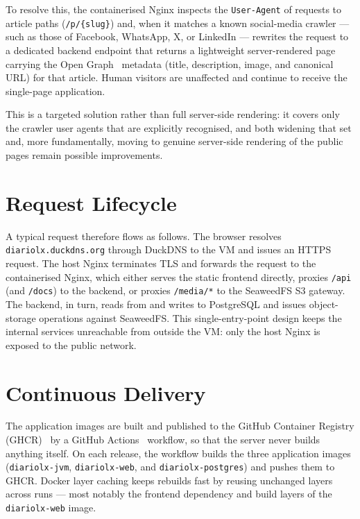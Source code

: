 To resolve this, the containerised Nginx inspects the \texttt{User-Agent} of requests to
article paths (\texttt{/p/\{slug\}}) and, when it matches a known social-media crawler ---
such as those of Facebook, WhatsApp, X, or LinkedIn --- rewrites the request to a dedicated
backend endpoint that returns a lightweight server-rendered page carrying the Open
Graph~\cite{ogp} metadata (title, description, image, and canonical URL) for that article.
Human visitors are unaffected and continue to receive the single-page application.

This is a targeted solution rather than full server-side rendering: it covers only the
crawler user agents that are explicitly recognised, and both widening that set and, more
fundamentally, moving to genuine server-side rendering of the public pages remain possible
improvements.

\section{Request Lifecycle} \label{sec:dep_lifecycle}

A typical request therefore flows as follows. The browser resolves
\texttt{diariolx.duckdns.org} through DuckDNS to the VM and issues an HTTPS request. The
host Nginx terminates TLS and forwards the request to the containerised Nginx, which
either serves the static frontend directly, proxies \texttt{/api} (and \texttt{/docs})
to the backend, or proxies \texttt{/media/*} to the SeaweedFS S3 gateway. The backend,
in turn, reads from and writes to PostgreSQL and issues object-storage operations
against SeaweedFS. This single-entry-point design keeps the internal services
unreachable from outside the VM: only the host Nginx is exposed to the public network.

\section{Continuous Delivery} \label{sec:dep_cd}

The application images are built and published to the GitHub Container Registry (GHCR)~\cite{ghcr}
by a GitHub Actions~\cite{github_actions} workflow, so that the server never builds anything itself. On each
release, the workflow builds the three application images (\texttt{diariolx-jvm},
\texttt{diariolx-web}, and \texttt{diariolx-postgres}) and pushes them to GHCR. Docker
layer caching keeps rebuilds fast by reusing unchanged layers across runs --- most
notably the frontend dependency and build layers of the \texttt{diariolx-web} image.

